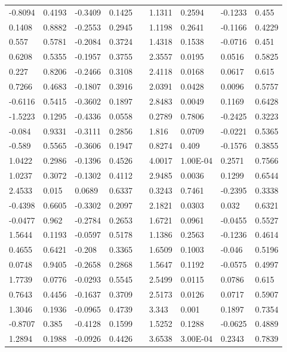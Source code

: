 \begin{table}[h!]
\begin{tabular}{lllllllll}
-0.8094 & 0.4193 & -0.3409 & 0.1425 &  & 1.1311 & 0.2594 & -0.1233 & 0.455 \\
0.1408 & 0.8882 & -0.2553 & 0.2945 &  & 1.1198 & 0.2641 & -0.1166 & 0.4229 \\
0.557 & 0.5781 & -0.2084 & 0.3724 &  & 1.4318 & 0.1538 & -0.0716 & 0.451 \\
0.6208 & 0.5355 & -0.1957 & 0.3755 &  & 2.3557 & 0.0195 & 0.0516 & 0.5825 \\
0.227 & 0.8206 & -0.2466 & 0.3108 &  & 2.4118 & 0.0168 & 0.0617 & 0.615 \\
0.7266 & 0.4683 & -0.1807 & 0.3916 &  & 2.0391 & 0.0428 & 0.0096 & 0.5757 \\
-0.6116 & 0.5415 & -0.3602 & 0.1897 &  & 2.8483 & 0.0049 & 0.1169 & 0.6428 \\
-1.5223 & 0.1295 & -0.4336 & 0.0558 &  & 0.2789 & 0.7806 & -0.2425 & 0.3223 \\
-0.084 & 0.9331 & -0.3111 & 0.2856 &  & 1.816 & 0.0709 & -0.0221 & 0.5365 \\
-0.589 & 0.5565 & -0.3606 & 0.1947 &  & 0.8274 & 0.409 & -0.1576 & 0.3855 \\
1.0422 & 0.2986 & -0.1396 & 0.4526 &  & 4.0017 & 1.00E-04 & 0.2571 & 0.7566 \\
1.0237 & 0.3072 & -0.1302 & 0.4112 &  & 2.9485 & 0.0036 & 0.1299 & 0.6544 \\
2.4533 & 0.015 & 0.0689 & 0.6337 &  & 0.3243 & 0.7461 & -0.2395 & 0.3338 \\
-0.4398 & 0.6605 & -0.3302 & 0.2097 &  & 2.1821 & 0.0303 & 0.032 & 0.6321 \\
-0.0477 & 0.962 & -0.2784 & 0.2653 &  & 1.6721 & 0.0961 & -0.0455 & 0.5527 \\
1.5644 & 0.1193 & -0.0597 & 0.5178 &  & 1.1386 & 0.2563 & -0.1236 & 0.4614 \\
0.4655 & 0.6421 & -0.208 & 0.3365 &  & 1.6509 & 0.1003 & -0.046 & 0.5196 \\
0.0748 & 0.9405 & -0.2658 & 0.2868 &  & 1.5647 & 0.1192 & -0.0575 & 0.4997 \\
1.7739 & 0.0776 & -0.0293 & 0.5545 &  & 2.5499 & 0.0115 & 0.0786 & 0.615 \\
0.7643 & 0.4456 & -0.1637 & 0.3709 &  & 2.5173 & 0.0126 & 0.0717 & 0.5907 \\
1.3046 & 0.1936 & -0.0965 & 0.4739 &  & 3.343 & 0.001 & 0.1897 & 0.7354 \\
-0.8707 & 0.385 & -0.4128 & 0.1599 &  & 1.5252 & 0.1288 & -0.0625 & 0.4889 \\
1.2894 & 0.1988 & -0.0926 & 0.4426 &  & 3.6538 & 3.00E-04 & 0.2343 & 0.7839 \\

\end{tabular}
\end{table}
